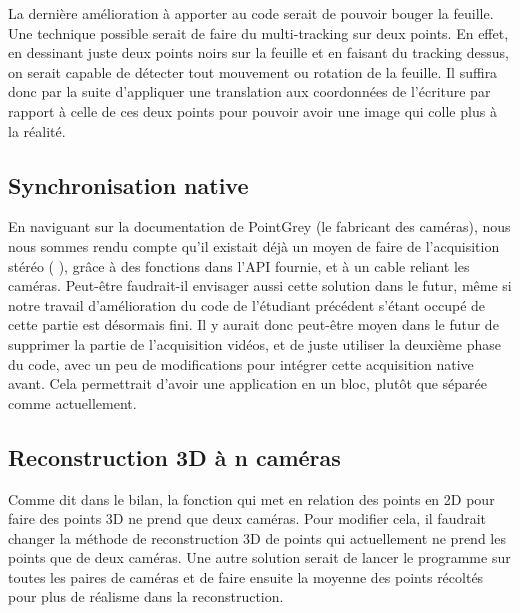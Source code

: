 La dernière amélioration à apporter au code serait de pouvoir bouger la feuille. Une technique possible serait de faire du multi-tracking sur deux points. En effet, en dessinant juste deux points noirs sur la feuille et en faisant du tracking dessus, on serait capable de détecter tout mouvement ou rotation de la feuille. Il suffira donc par la suite d'appliquer une translation aux coordonnées de l'écriture par rapport à celle de ces deux points pour pouvoir avoir une image qui colle plus à la réalité.

\subsection{Synchronisation native}
En naviguant sur la documentation de PointGrey (le fabricant des caméras), nous nous sommes rendu compte qu'il existait déjà un moyen de faire de l'acquisition stéréo ( \cite{stereo_pt} ), grâce à des fonctions dans l'API fournie, et à un cable reliant les caméras. Peut-être faudrait-il envisager aussi cette solution dans le futur, même si notre travail d'amélioration du code de l'étudiant précédent s'étant occupé de cette partie est désormais fini. Il y aurait donc peut-être moyen dans le futur de supprimer la partie de l'acquisition vidéos, et de juste utiliser la deuxième phase du code, avec un peu de modifications pour intégrer cette acquisition native avant. Cela permettrait d'avoir une application en un bloc, plutôt que séparée comme actuellement.

\subsection{Reconstruction 3D à n caméras}
Comme dit dans le bilan, la fonction qui met en relation des points en 2D pour faire des points 3D ne prend que deux caméras. Pour modifier cela, il faudrait changer la méthode de reconstruction 3D de points qui actuellement ne prend les points que de deux caméras. Une autre solution serait de lancer le programme sur toutes les paires de caméras et de faire ensuite la moyenne des points récoltés pour plus de réalisme dans la reconstruction.